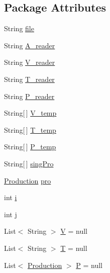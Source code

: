 \subsection*{Package Attributes}
\begin{DoxyCompactItemize}
\item 
String \hyperlink{classinput_parser_1_1_four_line_input_parser_ab974828c70b8a1335c806d6d3cf83da7}{file}
\item 
String \hyperlink{classinput_parser_1_1_four_line_input_parser_a9ed7517e786d914194ee6e2e7a2dedf9}{A\-\_\-reader}
\item 
String \hyperlink{classinput_parser_1_1_four_line_input_parser_ab32a6cf6e1398b4d6df4cde2036dfc82}{V\-\_\-reader}
\item 
String \hyperlink{classinput_parser_1_1_four_line_input_parser_ac942629b7fbdf58ea902eaccfba356b4}{T\-\_\-reader}
\item 
String \hyperlink{classinput_parser_1_1_four_line_input_parser_a72862efdd54896c843b7ad5677f33515}{P\-\_\-reader}
\item 
String\mbox{[}$\,$\mbox{]} \hyperlink{classinput_parser_1_1_four_line_input_parser_a70d648d67b885eeef32f47162ffa81ae}{V\-\_\-temp}
\item 
String\mbox{[}$\,$\mbox{]} \hyperlink{classinput_parser_1_1_four_line_input_parser_a17b5ddecc36fdca0cc0be1d613a20caa}{T\-\_\-temp}
\item 
String\mbox{[}$\,$\mbox{]} \hyperlink{classinput_parser_1_1_four_line_input_parser_adb2b6b325e8bc451ba7b46270ba4dea8}{P\-\_\-temp}
\item 
String\mbox{[}$\,$\mbox{]} \hyperlink{classinput_parser_1_1_four_line_input_parser_a7a3bb0e55f839ba984d0953724ea385a}{sing\-Pro}
\item 
\hyperlink{classcontext_free_1_1grammar_1_1_production}{Production} \hyperlink{classinput_parser_1_1_four_line_input_parser_ae0f524894f39d7a13bddd5e2efad8d3e}{pro}
\item 
int \hyperlink{classinput_parser_1_1_four_line_input_parser_a39fe356d1b2152557ca7c5d47b0d2f43}{i}
\item 
int \hyperlink{classinput_parser_1_1_four_line_input_parser_a6aaf88a0bec2622e542a59b4efdd19b6}{j}
\item 
List$<$ String $>$ \hyperlink{classinput_parser_1_1_four_line_input_parser_a1dd8814f232e9c83f48ead8cf5d9f2b2}{V} = null
\item 
List$<$ String $>$ \hyperlink{classinput_parser_1_1_four_line_input_parser_ac5810e00377c73d3218c6c517676c5d4}{T} = null
\item 
List$<$ \hyperlink{classcontext_free_1_1grammar_1_1_production}{Production} $>$ \hyperlink{classinput_parser_1_1_four_line_input_parser_a25cb1cc11bda9a906f0a29eb66444c76}{P} = null
\end{DoxyCompactItemize}


